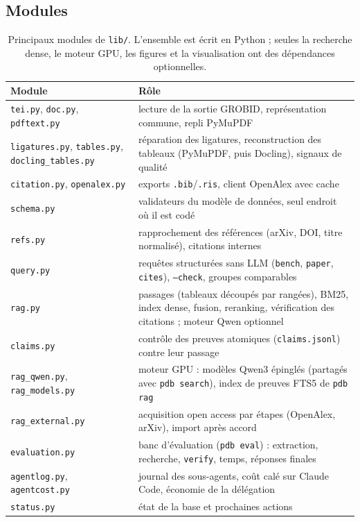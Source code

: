 \documentclass[11pt,a4paper]{article}
\newcommand{\cmd}[1]{\texttt{#1}}
\begin{document}
\subsection{Modules}

\begin{table}[ht]
\centering
\caption{Principaux modules de \cmd{lib/}. L'ensemble est écrit en Python ; seules la
recherche dense, le moteur GPU, les figures et la visualisation ont des dépendances optionnelles.}
\label{tab:modules}
\small
\begin{tabularx}{\linewidth}{@{}lL@{}}
\toprule
Module & Rôle \\
\midrule
\cmd{tei.py}, \cmd{doc.py}, \cmd{pdftext.py} & lecture de la sortie GROBID, représentation commune, repli PyMuPDF \\
\cmd{ligatures.py}, \cmd{tables.py}, \cmd{docling\_tables.py} & réparation des ligatures, reconstruction des tableaux (PyMuPDF, puis Docling), signaux de qualité \\
\cmd{citation.py}, \cmd{openalex.py} & exports \cmd{.bib}/\cmd{.ris}, client OpenAlex avec cache \\
\cmd{schema.py} & validateurs du modèle de données, seul endroit où il est codé \\
\cmd{refs.py} & rapprochement des références (arXiv, DOI, titre normalisé), citations internes \\
\cmd{query.py} & requêtes structurées sans LLM (\cmd{bench}, \cmd{paper}, \cmd{cites}), \cmd{--check}, groupes comparables \\
\cmd{rag.py} & passages (tableaux découpés par rangées), BM25, index dense, fusion, reranking, vérification des citations ; moteur Qwen optionnel \\
\cmd{claims.py} & contrôle des preuves atomiques (\cmd{claims.jsonl}) contre leur passage \\
\cmd{rag\_qwen.py}, \cmd{rag\_models.py} & moteur GPU : modèles Qwen3 épinglés (partagés avec \cmd{pdb search}), index de preuves FTS5 de \cmd{pdb rag} \\
\cmd{rag\_external.py} & acquisition open access par étapes (OpenAlex, arXiv), import après accord \\
\cmd{evaluation.py} & banc d'évaluation (\cmd{pdb eval}) : extraction, recherche, \cmd{verify}, temps, réponses finales \\
\cmd{agentlog.py}, \cmd{agentcost.py} & journal des sous-agents, coût calé sur Claude Code, économie de la délégation \\
\cmd{status.py} & état de la base et prochaines actions \\

\end{tabularx}
\end{table}
\end{document}
